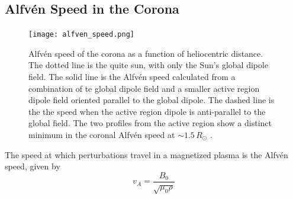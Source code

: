 \subsection{Alfv\'{e}n Speed in the Corona}
\begin{figure}[!t]
\begin{center}
\texttt{[image: alfven\_speed.png]}
\caption[Model of the Aflv\'{e}n speed as a function of height in the corona]{Alfv\'{e}n speed of the corona as a function of heliocentric distance. The dotted line is the quite sun, with only the Sun's global dipole field. The solid line is the Alfv\'{e}n speed calculated from a combination of te global dipole field and a smaller active region dipole field oriented parallel to the global dipole. The dashed line is the the speed when the active region dipole is anti-parallel to the global field. The two profiles from the active region show a distinct minimum in the coronal Alfv\'{e}n speed at $\sim1.5\,R_{\odot}$ \citep{mann2003}.}
\label{fig:alfven_speed}
\end{center}
\end{figure}
The speed at which perturbations travel in a magnetized plasma is the Alfv\'{e}n speed, given by
\begin{equation}
v_A = \frac{B_0}{\sqrt{\mu_0 \rho}}
\end{equation}
